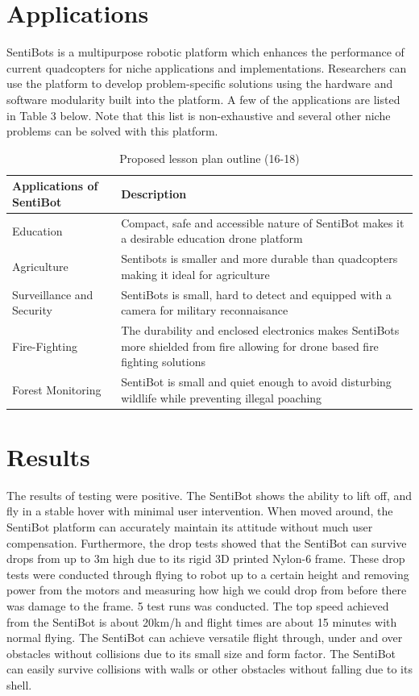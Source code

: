 \documentclass[12pt]{article}
\begin{document}
\section{Applications}

SentiBots is a multipurpose robotic platform which enhances the performance of current quadcopters for niche applications and implementations. Researchers can use the platform to develop problem-specific solutions using the hardware and software modularity built into the platform. A few of the applications are listed in Table 3 below. Note that this list is non-exhaustive and several other niche problems can be solved with this platform.

\begin{table}[h]
	\centering
	\begin{tabularx}{\linewidth}{ | >{\setlength\hsize{.3\hsize}} X | >{\setlength\hsize{.5\hsize}} X }
		Applications of SentiBot & Description \\
		\hline
		Education & Compact, safe and accessible nature of SentiBot makes it a desirable education drone platform \\
		Agriculture &  Sentibots is smaller and more durable than quadcopters making it ideal for agriculture \\
		Surveillance and Security & SentiBots is small, hard to detect and equipped with a camera for military reconnaisance  \\
		Fire-Fighting & The durability and enclosed electronics makes SentiBots more shielded from fire allowing for drone based fire fighting solutions \\
		Forest Monitoring & SentiBot is small and quiet enough to avoid disturbing wildlife while preventing illegal poaching \\
	\end{tabularx}
	\caption{Proposed lesson plan outline (16-18)}
	\label{tab:lessonplan1}
\end{table}

\section{Results}

The results of testing were positive. The SentiBot shows the ability to lift off, and fly in a stable hover with minimal user intervention. When moved around, the SentiBot platform can accurately maintain its attitude without much user compensation. Furthermore, the drop tests showed that the SentiBot can survive drops from up to 3m high due to its rigid 3D printed Nylon-6 frame. These drop tests were conducted through flying to robot up to a certain height and removing power from the motors and measuring how high we could drop from before there was damage to the frame. 5 test runs was conducted. The top speed achieved from the SentiBot is about 20km/h and flight times are about 15 minutes with normal flying. The SentiBot can achieve versatile flight through, under and over obstacles without collisions due to its small size and form factor. The SentiBot can easily survive collisions with walls or other obstacles without falling due to its shell.
\end{document}
